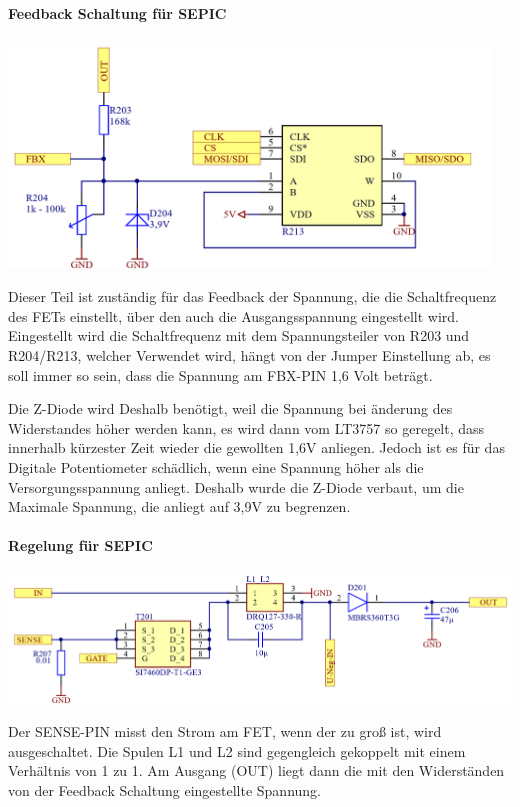 \documentclass[paper=a4, 12pt]{scrreprt}
\begin{document}
			\paragraph{Feedback Schaltung für SEPIC}
			\begin{adjustbox}{center,caption={Feedback Schaltung für SEPIC},label={fig:feedback},nofloat=figure,vspace=\bigskipamount}
				\includegraphics[height=6cm]{img/Feedback_SEPIC.PNG}
			\end{adjustbox}
			Dieser Teil ist zuständig für das Feedback der Spannung, die die Schaltfrequenz des FETs einstellt, über den auch die Ausgangsspannung eingestellt wird. Eingestellt wird die Schaltfrequenz mit dem Spannungsteiler von R203 und R204/R213, welcher Verwendet wird, hängt von der Jumper Einstellung ab, es soll immer so sein, dass die Spannung am FBX-PIN 1,6 Volt beträgt.
			
			Die Z-Diode wird Deshalb benötigt, weil die Spannung bei änderung des Widerstandes höher werden kann, es wird dann vom LT3757 so geregelt, dass innerhalb kürzester Zeit wieder die gewollten 1,6V anliegen. Jedoch ist es für das Digitale Potentiometer schädlich, wenn eine Spannung höher als die Versorgungsspannung anliegt. Deshalb wurde die Z-Diode verbaut, um die Maximale Spannung, die anliegt auf 3,9V zu begrenzen.
			\paragraph{Regelung für SEPIC}
			\begin{adjustbox}{center,caption={Regelungsschaltung für LT3757},label={fig:regelung},nofloat=figure,vspace=\bigskipamount}
				\includegraphics[width=\textwidth]{img/Regelung_SEPIC.PNG}
			\end{adjustbox}
			Der SENSE-PIN misst den Strom am FET, wenn der zu groß ist, wird ausgeschaltet. Die Spulen L1 und L2 sind gegengleich gekoppelt mit einem Verhältnis von 1 zu 1. Am Ausgang (OUT) liegt dann die mit den Widerständen von der Feedback Schaltung eingestellte Spannung.
			\pagebreak
\end{document}

